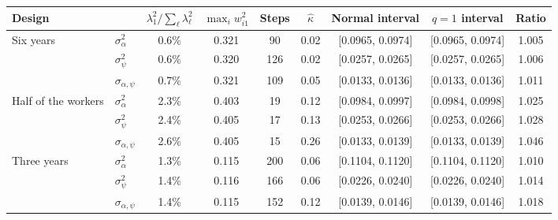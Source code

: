 \begin{tabular}{@{}l l c c c c c c c@{}}
\toprule
Design & & $\lambda_1^2/\sum_\ell\lambda_\ell^2$ & $\max_iw_{i1}^2$ & Steps & $\hat\kappa$ & Normal interval & $q=1$ interval & Ratio \\
\midrule
Six years & $\sigma^2_\alpha$ & 0.6\% & 0.321 & 90 & 0.02 & [0.0965, 0.0974] & [0.0965, 0.0974] & 1.005 \\
 & $\sigma^2_\psi$ & 0.6\% & 0.320 & 126 & 0.02 & [0.0257, 0.0265] & [0.0257, 0.0265] & 1.006 \\
 & $\sigma_{\alpha,\psi}$ & 0.7\% & 0.321 & 109 & 0.05 & [0.0133, 0.0136] & [0.0133, 0.0136] & 1.011 \\
\addlinespace
Half of the workers & $\sigma^2_\alpha$ & 2.3\% & 0.403 & 19 & 0.12 & [0.0984, 0.0997] & [0.0984, 0.0998] & 1.025 \\
 & $\sigma^2_\psi$ & 2.4\% & 0.405 & 17 & 0.13 & [0.0253, 0.0266] & [0.0253, 0.0266] & 1.028 \\
 & $\sigma_{\alpha,\psi}$ & 2.6\% & 0.405 & 15 & 0.26 & [0.0133, 0.0139] & [0.0133, 0.0139] & 1.046 \\
\addlinespace
Three years & $\sigma^2_\alpha$ & 1.3\% & 0.115 & 200 & 0.06 & [0.1104, 0.1120] & [0.1104, 0.1120] & 1.010 \\
 & $\sigma^2_\psi$ & 1.4\% & 0.116 & 166 & 0.06 & [0.0226, 0.0240] & [0.0226, 0.0240] & 1.014 \\
 & $\sigma_{\alpha,\psi}$ & 1.4\% & 0.115 & 152 & 0.12 & [0.0139, 0.0146] & [0.0139, 0.0146] & 1.018 \\
\bottomrule
\end{tabular}
